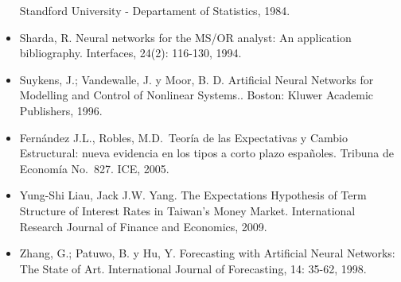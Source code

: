 \documentclass[
  12pt,
]{krantz}
\begin{document}
\begin{itemize}
  Standford University - Departament of Statistics, 1984.
\item
  Sharda, R. Neural networks for the MS/OR analyst: An application bibliography. Interfaces, 24(2): 116-130, 1994.
\item
  Suykens, J.; Vandewalle, J. y Moor, B. D. Artificial Neural Networks for Modelling and Control of Nonlinear Systems.. Boston: Kluwer Academic Publishers, 1996.
\item
  Fernández J.L., Robles, M.D.~Teoría de las Expectativas y Cambio Estructural: nueva evidencia en los tipos a corto plazo españoles. Tribuna de Economía No.~827. ICE, 2005.
\item
  Yung-Shi Liau, Jack J.W. Yang. The Expectations Hypothesis of Term Structure of Interest Rates in Taiwan's Money Market. International Research Journal of Finance and Economics, 2009.
\item
  Zhang, G.; Patuwo, B. y Hu, Y. Forecasting with Artificial Neural Networks: The State of Art. International Journal of Forecasting, 14: 35-62, 1998.
\end{itemize}

\backmatter
\printindex
\end{document}
